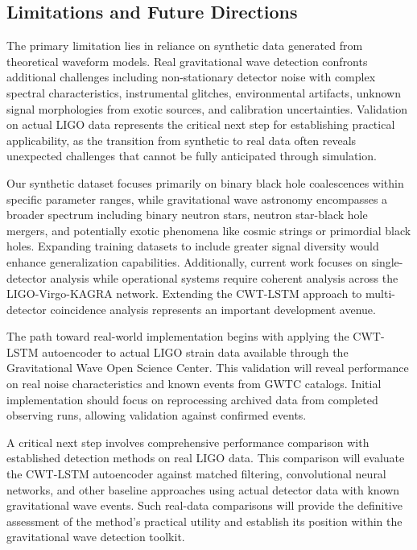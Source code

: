 \documentclass{iopjournal}
\begin{document}
\subsection{Limitations and Future Directions}

The primary limitation lies in reliance on synthetic data generated from theoretical waveform models. Real gravitational wave detection confronts additional challenges including non-stationary detector noise with complex spectral characteristics, instrumental glitches, environmental artifacts, unknown signal morphologies from exotic sources, and calibration uncertainties. Validation on actual LIGO data represents the critical next step for establishing practical applicability, as the transition from synthetic to real data often reveals unexpected challenges that cannot be fully anticipated through simulation.

Our synthetic dataset focuses primarily on binary black hole coalescences within specific parameter ranges, while gravitational wave astronomy encompasses a broader spectrum including binary neutron stars, neutron star-black hole mergers, and potentially exotic phenomena like cosmic strings or primordial black holes. Expanding training datasets to include greater signal diversity would enhance generalization capabilities. Additionally, current work focuses on single-detector analysis while operational systems require coherent analysis across the LIGO-Virgo-KAGRA network. Extending the CWT-LSTM approach to multi-detector coincidence analysis represents an important development avenue.

The path toward real-world implementation begins with applying the CWT-LSTM autoencoder to actual LIGO strain data available through the Gravitational Wave Open Science Center. This validation will reveal performance on real noise characteristics and known events from GWTC catalogs. Initial implementation should focus on reprocessing archived data from completed observing runs, allowing validation against confirmed events.

A critical next step involves comprehensive performance comparison with established detection methods on real LIGO data. This comparison will evaluate the CWT-LSTM autoencoder against matched filtering, convolutional neural networks, and other baseline approaches using actual detector data with known gravitational wave events. Such real-data comparisons will provide the definitive assessment of the method's practical utility and establish its position within the gravitational wave detection toolkit.
\end{document}
